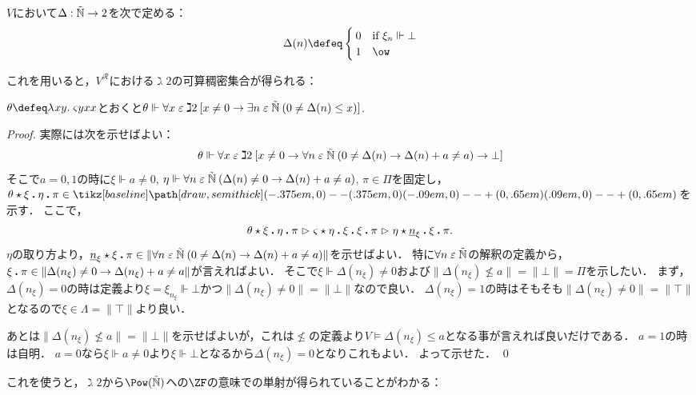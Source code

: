 \documentclass[realisability.tex]{subfiles}
\begin{document}
\begin{definition}[可算実現可能性代数の特性関数]
 $V$において$\Delta: \mathord{\tilde{\mathbb{N}}} \to 2$を次で定める：
 \[
  \Delta(n) \defeq
  \begin{cases}
   0 & \text{if } \xi_n \Vdash \bot\\
   1 & \ow
  \end{cases}
 \]
\end{definition}
これを用いると，$V^{\mathcal{R}}$における$\gimel 2$の可算稠密集合が得られる：
\begin{lemma}
 $\theta \defeq \abs{xy}{\varsigma y x x}$とおくと$\theta \Vdash \forall x \mathrel{\varepsilon} \gimel 2\:[x \neq 0 \to \exists n \mathrel{\varepsilon} \mathord{\tilde{\mathbb{N}}}\:(0 \neq \Delta(n) \leq x)]$.
\end{lemma}
\begin{proof}
 実際には次を示せばよい：
 \[
  \theta \Vdash \forall x \mathrel{\varepsilon} \gimel 2\:[x \neq 0 \to \forall n \mathrel{\varepsilon} \mathord{\tilde{\mathbb{N}}}\:(0 \neq \Delta(n) \to \Delta(n) + a \neq a) \to \bot]
 \]
 そこで$a = 0, 1$の時に$\xi \Vdash a \neq 0$, $\eta \Vdash \forall n \mathrel{\varepsilon} \mathord{\tilde{\mathbb{N}}}\:(\Delta(n) \neq 0 \to \Delta(n) + a \neq a)$, $\pi \in \Pi$を固定し，$\KVM{{\theta}{\xi}{\eta}{\pi}} \in \pole$を示す．
 ここで，
 \[
  \KVM{{\theta}{\xi}{\eta}{\pi}}
 \reds \KVM{{\varsigma}{\eta}{\xi}{\xi}{\pi}}
 \reds \KVM{\eta {{\num{n}_\xi}} \xi \pi}.
 \]
 $\eta$の取り方より，$\KVM{{{\num{n}_\xi}} \xi \pi} \in \|\forall n \strin \NN\: (0 \neq \Delta(n) \to \Delta(n) + a \neq a) \|$を示せばよい．
 特に$\forall n \mathrel{\varepsilon} \mathord{\tilde{\mathbb{N}}}$の解釈の定義から，$\xi \mathbin{\boldsymbol{.}} \pi \in \|\Delta(n_\xi) \neq 0 \to \Delta(n_\xi) + a \neq a\|$が言えればよい．
 そこで$\xi \Vdash \Delta(n_\xi) \neq 0$および$\|\Delta(n_\xi) \nleq a\| = \|\bot\| = \Pi$を示したい．
 まず，$\Delta(n_\xi) = 0$の時は定義より$\xi = \xi_{n_\xi} \Vdash \bot$かつ$\|\Delta(n_\xi) \neq 0\| = \|\bot\|$なので良い．
 $\Delta(n_\xi) = 1$の時はそもそも$\|\Delta(n_\xi) \neq 0\| = \|\top\|$となるので$\xi \in \Lambda = \|\top\|$より良い．

 あとは$\|\Delta(n_\xi) \nleq a\| = \|\bot\|$を示せばよいが，これは$\nleq$の定義より$V \models \Delta(n_\xi) \leq a$となる事が言えれば良いだけである．
 $a = 1$の時は自明．
 $a = 0$なら$\xi \Vdash a \neq 0$より$\xi \Vdash \bot$となるから$\Delta(n_\xi) = 0$となりこれもよい．
 よって示せた． \qed
\end{proof}

これを使うと，$\gimel 2$から$\Pow(\NN)$への$\ZF$の意味での単射が得られていることがわかる：
\end{document}
